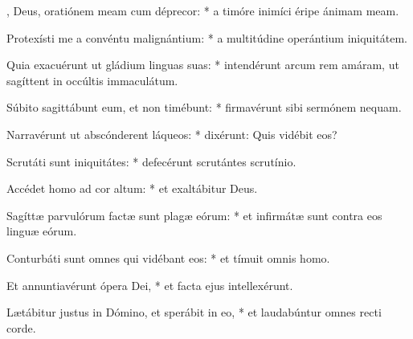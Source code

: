 \begin{psalmus}
    
    , Deus, oratiónem meam cum déprecor: * a timóre inimíci éripe ánimam meam.
    
    Protexísti me a convéntu malignántium: * a multitúdine operántium iniquitátem.
    
    Quia exacuérunt ut gládium linguas suas: * intendérunt arcum rem amáram, ut sagíttent in occúltis immaculátum.
    
    Súbito sagittábunt eum, et non timébunt: * firmavérunt sibi sermónem nequam.
    
    Narravérunt ut abscónderent láqueos: * dixérunt: Quis vidébit eos?
    
    Scrutáti sunt iniquitátes: * defecérunt scrutántes scrutínio.
    
    Accédet homo ad cor altum: * et exaltábitur Deus.
    
    Sagíttæ parvulórum factæ sunt plagæ eórum: * et infirmátæ sunt contra eos linguæ eórum.
    
    Conturbáti sunt omnes qui vidébant eos: * et tímuit omnis homo.
    
    Et annuntiavérunt ópera Dei, * et facta ejus intellexérunt.
    
    Lætábitur justus in Dómino, et sperábit in eo, * et laudabúntur omnes recti corde.
    
    \end{psalmus}
